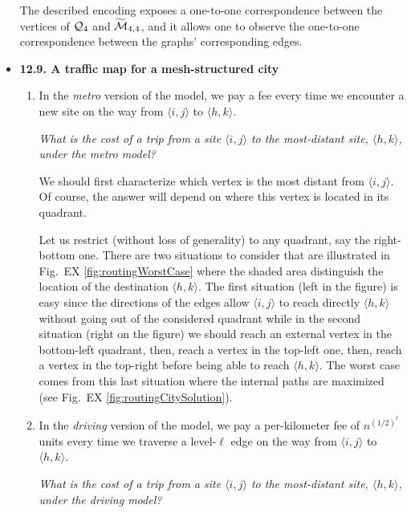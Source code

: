 \begin{itemize}
\medskip

The described encoding exposes a one-to-one correspondence between the vertices of  $\mbox{$\cal Q$}_4$ and $\widetilde{\mbox{$\cal M$}}_{4,4}$, and it allows one to observe the one-to-one correspondence between the graphs' corresponding edges.


\medskip\item
{\bf 12.9. A traffic map for a mesh-structured city}
\smallskip


  \begin{enumerate}
  \item
In the {\em metro} version of the model, we pay a fee every time we encounter a new site on the way from $\langle i,j \rangle$ to $\langle h,k \rangle$.

\smallskip

{\em What is the cost of a trip from a site $\langle i,j \rangle$ to the most-distant site, $\langle h,k \rangle$, under the metro model?}
\smallskip

We should first characterize which vertex is the most distant from $\langle i,j \rangle$. 
Of course, the answer will depend on where this vertex is located in its quadrant.

Let us restrict (without loss of generality) to any quadrant, say the right-bottom one. 
There are two situations to consider that are illustrated in Fig.~EX \ref{fig:routingWorstCase}
where the shaded area distinguish the location of the destination $\langle h,k \rangle$.
The first situation (left in the figure) is easy since the directions of the edges allow $\langle i,j \rangle$ to reach directly $\langle h,k \rangle$
without going out of the considered quadrant while in the second situation (right on the figure) we should reach an external
vertex in the bottom-left quadrant, then, reach a vertex in the top-left one, then, reach a vertex in the top-right before being able to
reach $\langle h,k \rangle$.
The worst case comes from this last situation where the internal paths are maximized (see Fig.~EX \ref{fig:routingCitySolution}).

  \medskip\item
In the {\em driving} version of the model, we pay a per-kilometer fee of $n^{(1/2)^\ell}$ units every time we traverse a level-$\ell$ edge on the way from $\langle i,j \rangle$ to $\langle h,k \rangle$.
 \smallskip


{\em What is the cost of a trip from a site $\langle i,j \rangle$ to the most-distant site, $\langle h,k \rangle$, under the driving model?}
\smallskip


\end{enumerate}
\end{itemize}
